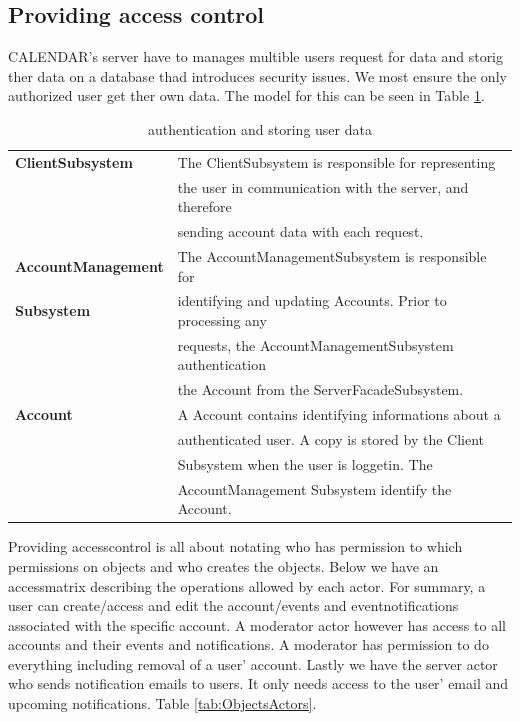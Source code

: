 \documentclass[a4paper]{article}
\begin{document}
\subsection{Providing access control}
\label{sec:accessControl}
  
  
CALENDAR's server have to manages multible users request for data and storig ther data on a database thad introduces security issues. We most ensure the only authorized user get ther own data. The model for this can be seen in Table \ref{tab:auther}.\\
  
\begin{table}
\centering

\begin{tabular}{l l}
	\hline
	\textbf{ClientSubsystem}	&The ClientSubsystem is responsible for representing\\
    							&the user in communication with the server, and therefore\\
                                &sending account data with each request.\\
    \hline
	\textbf{AccountManagement}	&The AccountManagementSubsystem is responsible for\\
    \textbf{Subsystem}			&identifying and updating Accounts. Prior to processing any\\
                                &requests, the AccountManagementSubsystem authentication\\
                                &the Account from the ServerFacadeSubsystem.\\
	\hline
	\textbf{Account}			&A Account contains identifying informations about a\\
    							&authenticated user. A copy is stored by the Client\\
    							&Subsystem when the user is loggetin. The\\
                                &AccountManagement Subsystem identify the Account.\\
	\hline
\end{tabular}

\caption{authentication and storing user data}
\label{tab:auther}

\end{table}
 
Providing accesscontrol is all about notating who has permission to which permissions on objects and who creates the objects. Below we have an accessmatrix describing the operations allowed by each actor. For summary, a user can create/access and edit the account/events and eventnotifications associated with the specific account. A moderator actor however has access to all accounts and their events and notifications. A moderator has permission to do everything including removal of a user’ account. Lastly we have the server actor who sends notification emails to users. It only needs access to the user’ email and upcoming notifications. Table \ref{tab:ObjectsActors}.\\
\end{document}
